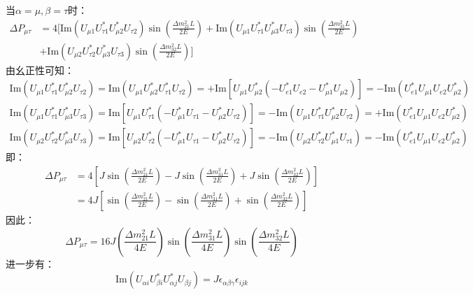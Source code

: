 \documentclass{article}
\begin{document}
	当$\alpha=\mu,\beta=\tau$时：
	\begin{equation*}
		\begin{aligned}
			\Delta P_{\mu\tau}&=4\Bigg[\mathrm{Im}(U_{\mu1}U_{\tau1}^\ast U_{\mu2}^\ast U_{\tau2})\sin\left(\frac{\Delta m_{21}^2L}{2E}\right)+\mathrm{Im}(U_{\mu1}U_{\tau1}^\ast U_{\mu3}^\ast U_{\tau3})\sin\left(\frac{\Delta m_{31}^2L}{2E}\right)\\
			&+\mathrm{Im}(U_{\mu2}U_{\tau2}^\ast U_{\mu3}^\ast U_{\tau3})\sin\left(\frac{\Delta m_{32}^2L}{2E}\right)\Bigg]
		\end{aligned}
	\end{equation*}
	由幺正性可知：
	\begin{gather*}
		\mathrm{Im}(U_{\mu1}U_{\tau1}^\ast U_{\mu2}^\ast U_{\tau2})=\mathrm{Im}(U_{\mu1}U_{\mu2}^*U_{\tau1}^*U_{\tau2})=+\mathrm{Im}[U_{\mu1}U_{\mu2}^*(-U_{e1}^*U_{e2}-U_{\mu1}^*U_{\mu2})]=-\mathrm{Im}(U_{e1}^*U_{\mu1}U_{e2}U_{\mu2}^*)\\
		\mathrm{Im}(U_{\mu1}U_{\tau1}^\ast U_{\mu3}^\ast U_{\tau3})=\mathrm{Im}[U_{\mu1}U_{\tau1}^*(-U_{\mu1}^*U_{\tau1}-U_{\mu2}^*U_{\tau2})]=-\mathrm{Im}(U_{\mu1}U_{\tau1}^*U_{\mu2}^*U_{\tau2})=+\mathrm{Im}(U_{e1}^*U_{\mu1}U_{e2}U_{\mu2}^*)\\
		\mathrm{Im}(U_{\mu2}U_{\tau2}^\ast U_{\mu3}^\ast U_{\tau3})=\mathrm{Im}[U_{\mu2}U_{\tau2}^\ast(-U_{\mu1}^*U_{\tau1}-U_{\mu2}^*U_{\tau2})]=-\mathrm{Im}(U_{\mu2}U_{\tau2}^\ast U_{\mu1}^*U_{\tau1})=-\mathrm{Im}(U_{e1}^*U_{\mu1}U_{e2}U_{\mu2}^*)
	\end{gather*}
	即：
	\begin{equation*}
		\begin{aligned}
			\Delta P_{\mu\tau}&=4\left[J\sin\left(\frac{\Delta m_{21}^2L}{2E}\right)-J\sin\left(\frac{\Delta m_{31}^2L}{2E}\right)+J\sin\left(\frac{\Delta m_{32}^2L}{2E}\right)\right]\\
			&=4J\left[\sin\left(\frac{\Delta m_{21}^2L}{2E}\right)-\sin\left(\frac{\Delta m_{31}^2L}{2E}\right)+\sin\left(\frac{\Delta m_{32}^2L}{2E}\right)\right]
		\end{aligned}
	\end{equation*}
	因此：
	\begin{equation*}
		\Delta P_{\mu\tau}=16J\left(\frac{\Delta m_{21}^2L}{4E}\right)\sin\left(\frac{\Delta m_{31}^2L}{4E}\right)\sin\left(\frac{\Delta m_{32}^2L}{4E}\right)
	\end{equation*}
	进一步有：
	\begin{equation*}
		\mathrm{Im}(U_{\alpha i}U_{\beta i}^*U_{\alpha j}^*U_{\beta j})=J\epsilon_{\alpha\beta\gamma}\epsilon_{ijk}
	\end{equation*}
\end{document}
